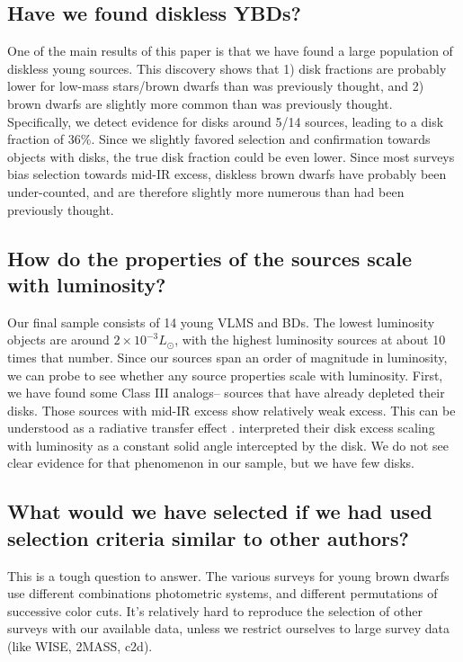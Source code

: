 \subsection{Have we found diskless YBDs?}
One of the main results of this paper is that we have found a large population of diskless young sources.  This discovery shows that 1) disk fractions are probably lower for low-mass stars/brown dwarfs than was previously thought, and 2) brown dwarfs are slightly more common than was previously thought.  Specifically, we detect evidence for disks around 5/14 sources, leading to a disk fraction of 36\%.  Since we slightly favored selection and confirmation towards objects with disks, the true disk fraction could be even lower.  Since most surveys bias selection towards mid-IR excess, diskless brown dwarfs have probably been under-counted, and are therefore slightly more numerous than had been previously thought.


\subsection{How do the properties of the sources scale with luminosity?}
Our final sample consists of 14 young VLMS and BDs.  The lowest luminosity objects are around $2 \times 10^{-3} L_{\odot}$, with the highest luminosity sources at about 10 times that number.  Since our sources span an order of magnitude in luminosity, we can probe to see whether any source properties scale with luminosity.  First, we have found some Class III analogs-- sources that have already depleted their disks.  Those sources with mid-IR excess show relatively weak excess.  This can be understood as a radiative transfer effect \citep{2012A&A...539A...9M,2009MNRAS.394L.141E}.  \cite{allers06} interpreted their disk excess scaling with luminosity as a constant solid angle intercepted by the disk.  We do not see clear evidence for that phenomenon in our sample, but we have few disks.  

\subsection{What would we have selected if we had used selection criteria similar to other authors?}
This is a tough question to answer.  The various surveys for young brown dwarfs use different combinations photometric systems, and different permutations of successive color cuts.  It's relatively hard to reproduce the selection of other surveys with our available data, unless we restrict ourselves to large survey data (like WISE, 2MASS, c2d).  

